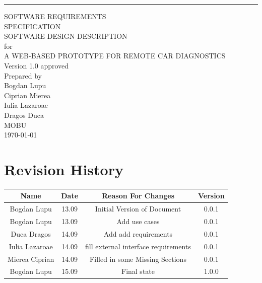 \documentclass{scrreprt}
\date{}
\def\myversion{1.0 }
\begin{document}
\begin{flushright}
    \rule{16cm}{5pt}\vskip1cm
    \begin{bfseries}
        \LARGE{SOFTWARE REQUIREMENTS\\ SPECIFICATION}\\
		\vspace{1cm}
		\LARGE{SOFTWARE DESIGN DESCRIPTION}\\
        \vspace{1cm}
        for\\
        \vspace{1cm}
		A WEB-BASED PROTOTYPE FOR REMOTE CAR DIAGNOSTICS\\
        \vspace{1cm}
        \Large{Version \myversion approved}\\
        \vspace{1cm}
        Prepared by\\
        \vspace{0.5cm} 
        Bogdan Lupu\\
        Ciprian Mierea\\
        Iulia Lazaroae\\
        Dragos Duca\\
        \vspace{1cm}
        MOBU\\
        \vspace{1cm}
        \today\\
    \end{bfseries}
\end{flushright}

\tableofcontents


\chapter*{Revision History}

\begin{center}
    \begin{tabular}{|c|c|c|c|}
        \hline
	    Name & Date & Reason For Changes & Version\\
        \hline
	    Bogdan Lupu & 13.09 & Initial Version of Document  & 0.0.1\\
        \hline
	    Bogdan Lupu & 13.09 & Add use cases & 0.0.1\\
        \hline
        Duca Dragos & 14.09 & Add add requirements & 0.0.1\\
        \hline
         Iulia Lazaroae & 14.09 & fill external interface requirements & 0.0.1\\
        \hline
        Mierea Ciprian & 14.09 & Filled in some Missing Sections & 0.0.1\\
        \hline
        Bogdan Lupu & 15.09 & Final state & 1.0.0\\
        \hline
    \end{tabular}
\end{center}
\end{document}

